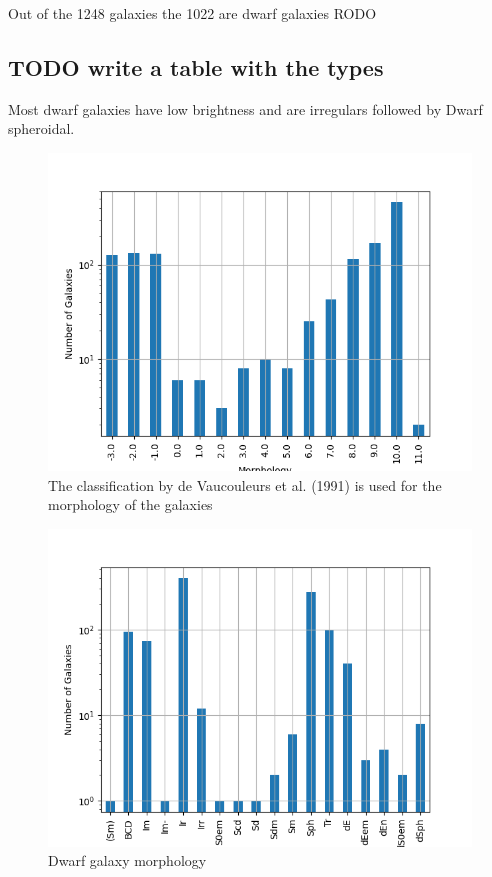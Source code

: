 \documentclass[a4paper,twocolumn]{article}
\begin{document}
Out of the 1248 galaxies the 1022 are dwarf galaxies
RODO

\subsection{{\bfseries\sffamily TODO} write a table with the types}
\label{sec:org6c7eaf8}

Most dwarf galaxies have low brightness and are irregulars followed by Dwarf spheroidal.

\begin{figure}[htbp]
\centering
\includegraphics[width=.9\linewidth]{./figs/hist-Type.png}
\caption{\label{Types of galaxies}The classification by de Vaucouleurs et al. (1991) is used for the morphology of the galaxies}
\end{figure}

\begin{figure}[htbp]
\centering
\includegraphics[width=.9\linewidth]{./figs/hist-Tdw1.png}
\caption{\label{Types of dwarf galaxies}Dwarf galaxy morphology}
\end{figure}
\end{document}
